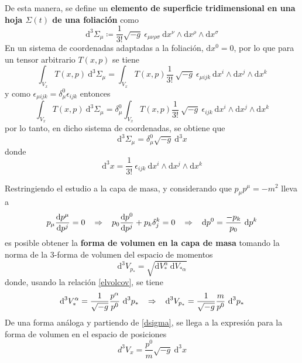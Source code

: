 \documentclass[11pt,twoside,openright,spanish]{report}
\numberwithin{equation}{chapter}
\numberwithin{figure}{chapter}
\numberwithin{table}{chapter}
\begin{document}
De esta manera, se define un \textbf{elemento de superficie tridimensional en una hoja $\Sigma(t)$ de una foliación} como
\begin{equation}
\text{d}^3\Sigma_\mu\coloneqq \frac{1}{3!}\sqrt{-g}\ \epsilon_{\mu\nu\rho\sigma}\ \text{d}x^\nu\wedge\text{d}x^\rho\wedge\text{d}x^\sigma
\end{equation}
En un sistema de coordenadas adaptadas a la foliación, $\text{d}x^0=0$, por lo que para un tensor arbitrario $T(x,p)$ se tiene
\begin{equation}
\int_{V_x}T(x,p)\ \text{d}^3\Sigma_\mu=\int_{V_x} T(x,p)\frac{1}{3!}\ \sqrt{-g}\ \epsilon_{\mu ijk}\ \text{d}x^i\wedge\text{d}x^j\wedge\text{d}x^k
\end{equation}
y como $\epsilon_{\mu ijk}=\delta^0_\mu\epsilon_{ijk}$ entonces
\begin{equation}
\int_{V_x}T(x,p)\ \text{d}^3\Sigma_\mu=\delta^0_\mu\int_{V_x} T(x,p)\frac{1}{3!}\ \sqrt{-g}\ \epsilon_{ijk}\ \text{d}x^i\wedge\text{d}x^j\wedge\text{d}x^k
\end{equation}
por lo tanto, en dicho sistema de coordenadas, se obtiene que
\begin{equation}
\text{d}^3\Sigma_\mu=\delta^0_\mu\sqrt{-g}\ \text{d}^3x\label{dsigma}
\end{equation}
donde 
\begin{equation}
\text{d}^3x=\frac{1}{3!}\ \epsilon_{ijk}\ \text{d}x^i\wedge\text{d}x^j\wedge\text{d}x^k
\end{equation}

Restringiendo el estudio a la capa de masa, y considerando que $p_\mu p^\mu=-m^2$ lleva a
\begin{align}
p_\mu\frac{\text{d}p^\mu}{\text{d}p^j}=0\hspace{0.3cm}\Rightarrow\hspace{0.3cm}p_0\frac{\text{d}p^0}{\text{d}p^j}+p_k\delta^k_j=0\hspace{0.3cm}\Rightarrow\hspace{0.3cm} \text{d}p^0=\frac{-p_k}{p_0}\ \text{d}p^k
\end{align} 
es posible obtener la \textbf{forma de volumen en la capa de masa} tomando la norma de la 3-forma de volumen del espacio de momentos
\begin{equation}
\text{d}^3V_{p_*}=\sqrt{\text{d}V_*^\alpha\ \text{d}V_{*\alpha}}
\end{equation}
donde, usando la relación \eqref{elvolcov}, se tiene
\begin{equation}
\text{d}^3V_*^\alpha=\frac{1}{\sqrt{-g}}\frac{p^\alpha}{p^0}\ \text{d}^3p_*\hspace{0.3cm}\Rightarrow\hspace{0.3cm}\text{d}^3V_{p_*}=\frac{1}{\sqrt{-g}}\frac{m}{p^0}\ \text{d}^3p_*
\label{volelempa}
\end{equation}
De una forma análoga y partiendo de \eqref{dsigma}, se llega a la expresión para la forma de volumen en el espacio de posiciones
\begin{equation}
d^3V_x=\frac{p^0}{m}\sqrt{-g}\ \text{d}^3x
\label{volelemxa}
\end{equation}
\end{document}

